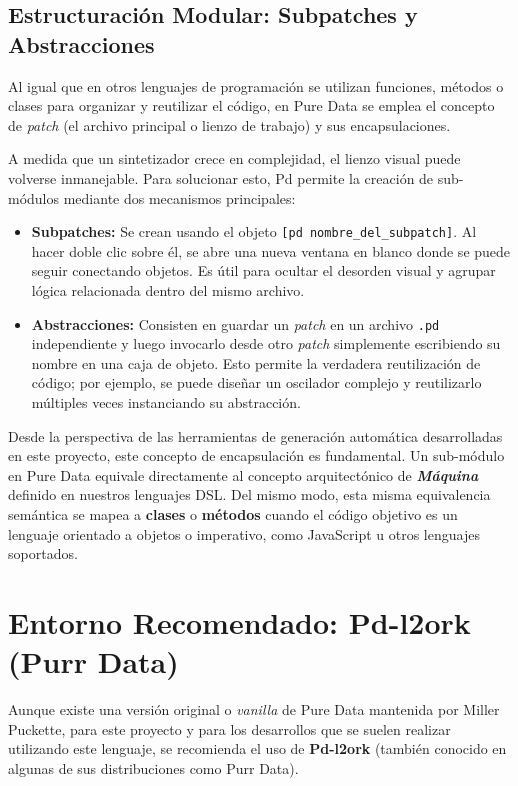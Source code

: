 \subsection{Estructuración Modular: Subpatches y Abstracciones}

Al igual que en otros lenguajes de programación se utilizan funciones, métodos o clases para organizar y reutilizar el código, en Pure Data se emplea el concepto de \textit{patch} (el archivo principal o lienzo de trabajo) y sus encapsulaciones.

A medida que un sintetizador crece en complejidad, el lienzo visual puede volverse inmanejable. Para solucionar esto, Pd permite la creación de sub-módulos mediante dos mecanismos principales:
\begin{itemize}
    \item \textbf{Subpatches:} Se crean usando el objeto \verb|[pd nombre_del_subpatch]|. Al hacer doble clic sobre él, se abre una nueva ventana en blanco donde se puede seguir conectando objetos. Es útil para ocultar el desorden visual y agrupar lógica relacionada dentro del mismo archivo.
    \item \textbf{Abstracciones:} Consisten en guardar un \textit{patch} en un archivo \texttt{.pd} independiente y luego invocarlo desde otro \textit{patch} simplemente escribiendo su nombre en una caja de objeto. Esto permite la verdadera reutilización de código; por ejemplo, se puede diseñar un oscilador complejo y reutilizarlo múltiples veces instanciando su abstracción.
\end{itemize}

Desde la perspectiva de las herramientas de generación automática desarrolladas en este proyecto, este concepto de encapsulación es fundamental. Un sub-módulo en Pure Data equivale directamente al concepto arquitectónico de \textbf{\textit{Máquina}} definido en nuestros lenguajes DSL. Del mismo modo, esta misma equivalencia semántica se mapea a \textbf{clases} o \textbf{métodos} cuando el código objetivo es un lenguaje orientado a objetos o imperativo, como JavaScript u otros lenguajes soportados.

\section{Entorno Recomendado: Pd-l2ork (Purr Data)}

Aunque existe una versión original o \textit{vanilla} de Pure Data mantenida por Miller Puckette, para este proyecto y para los desarrollos que se suelen realizar utilizando este lenguaje, se recomienda el uso de \textbf{Pd-l2ork} (también conocido en algunas de sus distribuciones como Purr Data). 

